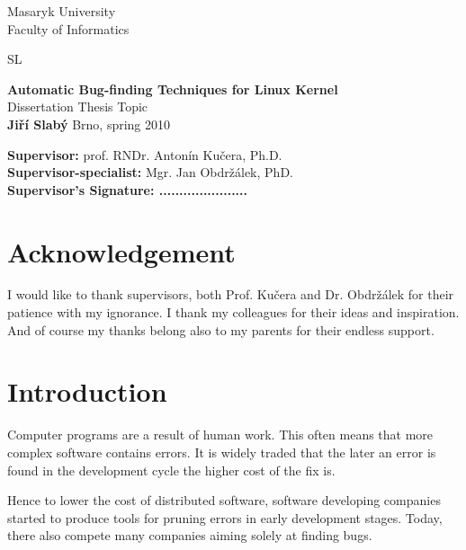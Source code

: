 \documentclass[11pt,a4paper]{article}
\begin{document}
\begin{titlepage}
\vspace{2cm}
\begin{center}
      {\sc Masaryk University\\Faculty of Informatics}

     \vspace{1cm}
     \logo SL

     \vspace{2cm}
     {\bf\huge Automatic Bug-finding Techniques for Linux Kernel}\\[0.8in]

     {\sc\large Dissertation Thesis Topic}\\[0.4in]

     {\Large\bf Jiří Slabý}
     \vfill
     {\large Brno, spring 2010}
     \vfill
\end{center}
     {\bf Supervisor:} prof. RNDr. Antonín Kučera, Ph.D.\\
     {\bf Supervisor-specialist:} Mgr. Jan Obdržálek, PhD.\\[1cm]
     {\bf Supervisor's Signature: ......................}
\end{titlepage}

\pagestyle{plain}

\null\vfill
\section*{Acknowledgement}
I would like to thank supervisors, both Prof. Kučera and Dr. Obdržálek for
their patience with my ignorance. I thank my colleagues for their ideas and
inspiration. And of course my thanks belong also to my parents for their
endless support.

\newpage

\tableofcontents

\newpage
{}

\section{Introduction}
Computer programs are a result of human work. This often means that more
complex software contains errors. It is widely traded that the later an error
is found in the development cycle the higher cost of the fix is.

Hence to lower the cost of distributed software, software developing companies
started to produce tools for pruning errors in early development stages.
Today, there also compete many companies aiming solely at finding bugs.
\end{document}

